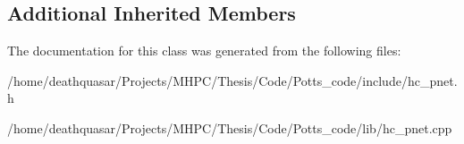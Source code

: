 \subsection*{Additional Inherited Members}


The documentation for this class was generated from the following files\+:\begin{DoxyCompactItemize}
\item 
/home/deathquasar/\+Projects/\+M\+H\+P\+C/\+Thesis/\+Code/\+Potts\+\_\+code/include/hc\+\_\+pnet.\+h\item 
/home/deathquasar/\+Projects/\+M\+H\+P\+C/\+Thesis/\+Code/\+Potts\+\_\+code/lib/hc\+\_\+pnet.\+cpp\end{DoxyCompactItemize}
